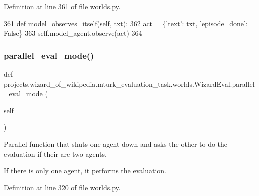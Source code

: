 Definition at line 361 of file worlds.\+py.


\begin{DoxyCode}
361     \textcolor{keyword}{def }model\_observes\_itself(self, txt):
362         act = \{\textcolor{stringliteral}{'text'}: txt, \textcolor{stringliteral}{'episode\_done'}: \textcolor{keyword}{False}\}
363         self.model\_agent.observe(act)
364 
\end{DoxyCode}
\mbox{\label{classprojects_1_1wizard__of__wikipedia_1_1mturk__evaluation__task_1_1worlds_1_1WizardEval_a1cffb86be3a550ac33519b487959ec8c}} 
\subsubsection{\texorpdfstring{parallel\+\_\+eval\+\_\+mode()}{parallel\_eval\_mode()}}
{\footnotesize\ttfamily def projects.\+wizard\+\_\+of\+\_\+wikipedia.\+mturk\+\_\+evaluation\+\_\+task.\+worlds.\+Wizard\+Eval.\+parallel\+\_\+eval\+\_\+mode (\begin{DoxyParamCaption}\item[{}]{self }\end{DoxyParamCaption})}

\begin{DoxyVerb}Parallel function that shuts one agent down and asks the other to do the
evaluation if their are two agents.

If there is only one agent, it performs the evaluation.
\end{DoxyVerb}
 

Definition at line 320 of file worlds.\+py.


